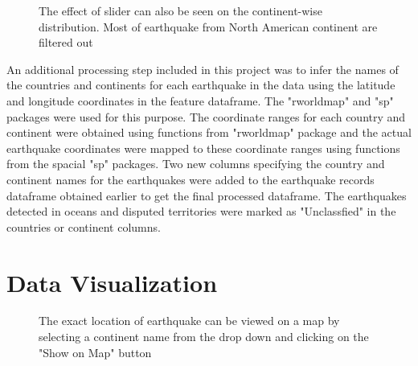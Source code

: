 \documentclass{article}
\begin{document}
		\begin{figure}
			\caption{The effect of slider can also be seen on the continent-wise distribution. Most of earthquake from North American continent are filtered out}
		\end{figure}
		
		An additional processing step included in this project was to infer the names of the countries and continents for each earthquake in the data using the latitude and longitude coordinates in the feature dataframe. The "rworldmap" and "sp" packages were used for this purpose. The coordinate ranges for each country and continent were obtained using functions from "rworldmap" package and the actual earthquake coordinates were mapped to these coordinate ranges using functions from the spacial "sp" packages. Two new columns specifying the country and continent names for the earthquakes were added to the earthquake records dataframe obtained earlier to get the final processed dataframe. The earthquakes detected in oceans and disputed territories were marked as "Unclassfied" in the countries or continent columns.
		
	\section{Data Visualization}
		
		\begin{figure}
			\caption{The exact location of earthquake can be viewed on a map by selecting a continent name from the drop down and clicking on the "Show on Map" button}
		\end{figure}
		
\end{document}
